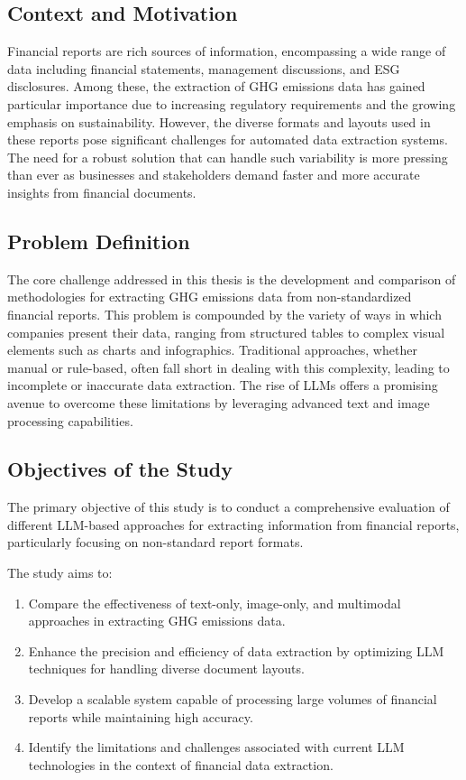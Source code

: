 \documentclass[english, 12pt, a4paper, elec, utf8, a-2b, online]{aaltothesis}
\begin{document}
\subsection{Context and Motivation}

Financial reports are rich sources of information, encompassing a wide range of data including financial statements, management discussions, and \ac{ESG} disclosures.
Among these, the extraction of \ac{GHG} emissions data has gained particular importance due to increasing regulatory requirements and the growing emphasis on sustainability.
However, the diverse formats and layouts used in these reports pose significant challenges for automated data extraction systems.
The need for a robust solution that can handle such variability is more pressing than ever as businesses and stakeholders demand faster and more accurate insights from financial documents.

\subsection{Problem Definition}

The core challenge addressed in this thesis is the development and comparison of methodologies for extracting \ac{GHG} emissions data from non-standardized financial reports.
This problem is compounded by the variety of ways in which companies present their data, ranging from structured tables to complex visual elements such as charts and infographics.
Traditional approaches, whether manual or rule-based, often fall short in dealing with this complexity, leading to incomplete or inaccurate data extraction.
The rise of \acp{LLM} offers a promising avenue to overcome these limitations by leveraging advanced text and image processing capabilities.

\subsection{Objectives of the Study}

The primary objective of this study is to conduct a comprehensive evaluation of different \ac{LLM}-based approaches for extracting information from financial reports, particularly focusing on non-standard report formats.

The study aims to:
\begin{enumerate}
    \item Compare the effectiveness of text-only, image-only, and multimodal approaches in extracting \ac{GHG} emissions data.
    \item Enhance the precision and efficiency of data extraction by optimizing \ac{LLM} techniques for handling diverse document layouts.
    \item Develop a scalable system capable of processing large volumes of financial reports while maintaining high accuracy.
    \item Identify the limitations and challenges associated with current \ac{LLM} technologies in the context of financial data extraction.
\end{enumerate}
\end{document}
